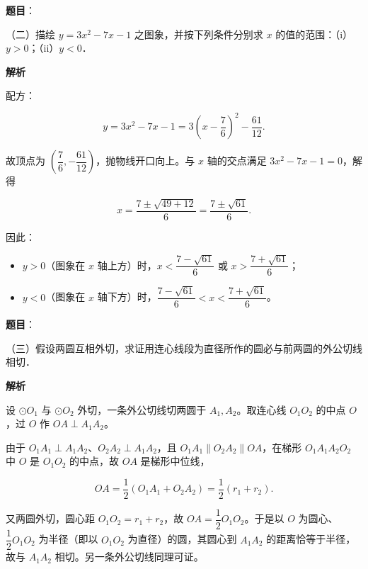 \begin{answer}

\textbf{题目}：

（二）描绘 $y=3x^2-7x-1$ 之图象，并按下列条件分别求 $x$ 的值的范围：（i）$y>0$；（ii）$y<0$．

\textbf{解析}

配方：

\nopagebreak[4]
\[
y=3x^2-7x-1=3\left(x-\frac76\right)^2-\frac{61}{12}.
\]

故顶点为 $\left(\dfrac76,-\dfrac{61}{12}\right)$，抛物线开口向上。与 $x$ 轴的交点满足 $3x^2-7x-1=0$，解得

\nopagebreak[4]
\[
x=\frac{7\pm\sqrt{49+12}}{6}=\frac{7\pm\sqrt{61}}{6}.
\]

因此：

\begin{itemize}
\item $y>0$（图象在 $x$ 轴上方）时，$x<\dfrac{7-\sqrt{61}}6$ 或 $x>\dfrac{7+\sqrt{61}}6$；
\item $y<0$（图象在 $x$ 轴下方）时，$\dfrac{7-\sqrt{61}}6<x<\dfrac{7+\sqrt{61}}6$。
\end{itemize}


\end{answer}
\begin{answer}

\textbf{题目}：

（三）假设两圆互相外切，求证用连心线段为直径所作的圆必与前两圆的外公切线相切．

\textbf{解析}

设 $\odot O_1$ 与 $\odot O_2$ 外切，一条外公切线切两圆于 $A_1,A_2$。取连心线 $O_1O_2$ 的中点 $O$，过 $O$ 作 $OA\perp A_1A_2$。

由于 $O_1A_1\perp A_1A_2$、$O_2A_2\perp A_1A_2$，且 $O_1A_1\parallel O_2A_2\parallel OA$，在梯形 $O_1A_1A_2O_2$ 中 $O$ 是 $O_1O_2$ 的中点，故 $OA$ 是梯形中位线，

\nopagebreak[4]
\[
OA=\frac12(O_1A_1+O_2A_2)=\frac12(r_1+r_2).
\]

又两圆外切，圆心距 $O_1O_2=r_1+r_2$，故 $OA=\dfrac12 O_1O_2$。于是以 $O$ 为圆心、$\dfrac12 O_1O_2$ 为半径（即以 $O_1O_2$ 为直径）的圆，其圆心到 $A_1A_2$ 的距离恰等于半径，故与 $A_1A_2$ 相切。另一条外公切线同理可证。


\end{answer}

